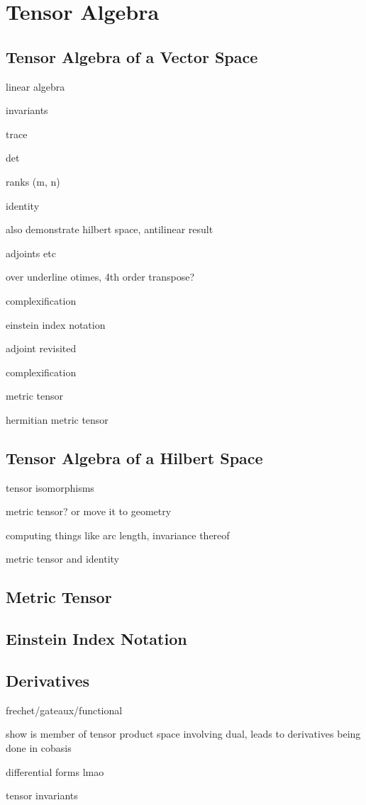 \chapter{Tensor Algebra}
\label{chapter:Tensor-Algebra}


\section{Tensor Algebra of a Vector Space}

linear algebra

invariants

trace

det

ranks (m, n)

identity

also demonstrate hilbert space, antilinear result

adjoints etc

over underline otimes, 4th order transpose?

complexification

einstein index notation

adjoint revisited

complexification

metric tensor

hermitian metric tensor

\section{Tensor Algebra of a Hilbert Space}

tensor isomorphisms

metric tensor? or move it to geometry

computing things like arc length, invariance thereof

metric tensor and identity

\section{Metric Tensor}

\section{Einstein Index Notation}

\section{Derivatives}

frechet/gateaux/functional

show is member of tensor product space involving dual, leads to derivatives being done in cobasis

differential forms lmao

tensor invariants